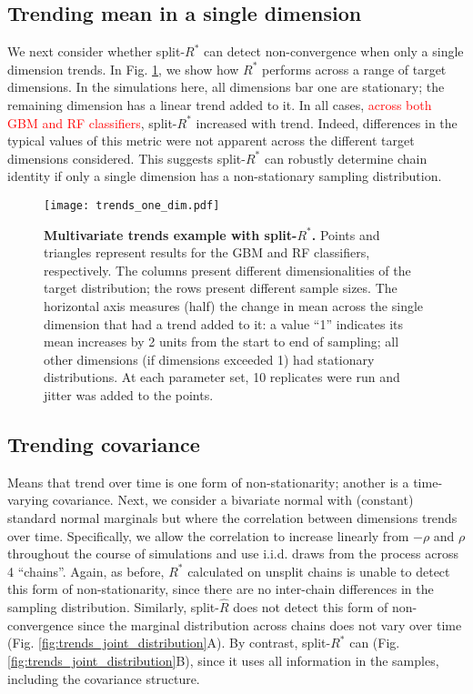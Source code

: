 \documentclass{article}
\begin{document}
\subsection{Trending mean in a single dimension}\label{sec:non-stationary_single}
We next consider whether split-$R^*$ can detect non-convergence when only a single dimension trends. In Fig. \ref{fig:trends_one_dim}, we show how $R^*$ performs across a range of target dimensions. In the simulations here, all dimensions bar one are stationary; the remaining dimension has a linear trend added to it. In all cases, \textcolor{red}{across both GBM and RF classifiers}, split-$R^*$ increased with trend. Indeed, differences in the typical values of this metric were not apparent across the different target dimensions considered. This suggests split-$R^*$ can robustly determine chain identity if only a single dimension has a non-stationary sampling distribution.


\begin{figure}[!htb]
	\centerline{\texttt{[image: trends\_one\_dim.pdf]}}
	\caption{\textbf{Multivariate trends example with split-$R^*$.} Points and triangles represent results for the GBM and RF classifiers, respectively. The columns present different dimensionalities of the target distribution; the rows present different sample sizes. The horizontal axis measures (half) the change in mean across the single dimension that had a trend added to it: a value ``1'' indicates its mean increases by 2 units from the start to end of sampling; all other dimensions (if dimensions exceeded 1) had stationary distributions. At each parameter set, 10 replicates were run and jitter was added to the points.}
	\label{fig:trends_one_dim}
\end{figure}

\subsection{Trending covariance}\label{sec:non-stationary_covariance}
Means that trend over time is one form of non-stationarity; another is a time-varying covariance. Next, we consider a bivariate normal with (constant) standard normal marginals but where the correlation between dimensions trends over time. Specifically, we allow the correlation to increase linearly from $-\rho$ and $\rho$ throughout the course of simulations and use i.i.d. draws from the process across 4 ``chains''. Again, as before, $R^*$ calculated on unsplit chains is unable to detect this form of non-stationarity, since there are no inter-chain differences in the sampling distribution. Similarly, split-$\widehat{R}$ does not detect this form of non-convergence since the marginal distribution across chains does not vary over time (Fig. \ref{fig:trends_joint_distribution}A). By contrast, split-$R^*$ can (Fig. \ref{fig:trends_joint_distribution}B), since it uses all information in the samples, including the covariance structure.
\end{document}
